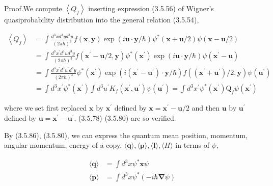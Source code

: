 \documentclass{article}
\begin{document}
Proof.We compute $\left\langle Q_{f}\right\rangle$ inserting expression (3.5.56) of Wigner's quasiprobability distribution into the general relation (3.5.54),
 
\begin{align*}
\left\langle Q_{f}\right\rangle & =\int \frac{d^{3} x d^{3} y d^{3} u}{(2 \pi \hbar)^{3}} f(\boldsymbol{x}, \boldsymbol{y}) \exp (i \boldsymbol{u} \cdot \boldsymbol{y} / \hbar) \psi^{*}(\boldsymbol{x}+\boldsymbol{u} / 2) \psi(\boldsymbol{x}-\boldsymbol{u} / 2)  \tag{3.5.81}\\
& =\int \frac{d^{3} x^{\prime} d^{3} u d^{3} y}{(2 \pi \hbar)^{3}} f\left(\boldsymbol{x}^{\prime}-\boldsymbol{u} / 2, \boldsymbol{y}\right) \psi^{*}\left(\boldsymbol{x}^{\prime}\right) \exp (i \boldsymbol{u} \cdot \boldsymbol{y} / \hbar) \psi\left(\boldsymbol{x}^{\prime}-\boldsymbol{u}\right) \\
& =\int \frac{d^{3} x^{\prime} d^{3} u^{\prime} d^{3} y}{(2 \pi \hbar)^{3}} \psi^{*}\left(\boldsymbol{x}^{\prime}\right) \exp \left(i\left(\boldsymbol{x}^{\prime}-\boldsymbol{u}^{\prime}\right) \cdot \boldsymbol{y} / \hbar\right) f\left(\left(\boldsymbol{x}^{\prime}+\boldsymbol{u}^{\prime}\right) / 2, \boldsymbol{y}\right) \psi\left(\boldsymbol{u}^{\prime}\right) \\
& =\int d^{3} x^{\prime} \psi^{*}\left(\boldsymbol{x}^{\prime}\right) \int d^{3} u^{\prime} K_{f}\left(\boldsymbol{x}^{\prime}, \boldsymbol{u}^{\prime}\right) \psi\left(\boldsymbol{u}^{\prime}\right)=\int d^{3} x^{\prime} \psi^{*}\left(\boldsymbol{x}^{\prime}\right) \mathrm{Q}_{f} \psi\left(\boldsymbol{x}^{\prime}\right)
\end{align*}
 
where we set first replaced $\boldsymbol{x}$ by $\boldsymbol{x}^{\prime}$ defined by $\boldsymbol{x}=\boldsymbol{x}^{\prime}-\boldsymbol{u} / 2$ and then $\boldsymbol{u}$ by $\boldsymbol{u}^{\prime}$ defined by $\boldsymbol{u}=\boldsymbol{x}^{\prime}-\boldsymbol{u}^{\prime}$. (3.5.78)-(3.5.80) are so verified.

By (3.5.86), (3.5.80), we can express the quantum mean position, momentum, angular momentum, energy of a copy, $\langle\boldsymbol{q}\rangle,\langle\boldsymbol{p}\rangle,\langle\boldsymbol{l}\rangle,\langle H\rangle$ in terms of $\psi$,
 
\begin{align*}
\langle\boldsymbol{q}\rangle & =\int d^{3} x \psi^{*} \boldsymbol{x} \psi  \tag{3.5.82}\\
\langle\boldsymbol{p}\rangle & =\int d^{3} x \psi^{*}(-i \hbar \boldsymbol{\nabla} \psi) \tag{3.5.83}
\end{align*}
 
\end{document}

